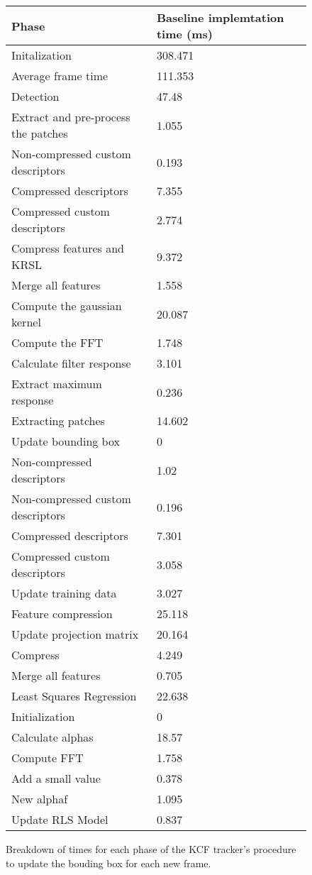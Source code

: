 \documentclass[11pt,english,letter]{article}
\begin{document}
\begin{figure}[htbp]
\begin{center}
    \begin{tabular}{ll}\hline
        \rowcolor{gray!30}Phase&Baseline implemtation time (ms)\\\hline
        \rowcolor{gray!20}Initalization&308.471\\
        \rowcolor{gray!20}Average frame time&111.353\\
        \rowcolor{gray!20}Detection&47.48\\
        Extract and pre-process the patches&1.055\\
        Non-compressed custom descriptors&0.193\\
        Compressed descriptors&7.355\\
        Compressed custom descriptors&2.774\\
        Compress features and KRSL&9.372\\
        Merge all features&1.558\\
        Compute the gaussian kernel&20.087\\
        Compute the FFT&1.748\\
        Calculate filter response&3.101\\
        Extract maximum response&0.236\\
        \rowcolor{gray!20}Extracting patches&14.602\\
        Update bounding box&0\\
        Non-compressed descriptors&1.02\\
        Non-compressed custom descriptors&0.196\\
        Compressed descriptors&7.301\\
        Compressed custom descriptors&3.058\\
        Update training data&3.027\\
        \rowcolor{gray!20}Feature compression&25.118\\
        Update projection matrix&20.164\\
        Compress&4.249\\
        Merge all features&0.705\\
        \rowcolor{gray!20}Least Squares Regression&22.638\\
        Initialization&0\\
        Calculate alphas&18.57\\
        Compute FFT&1.758\\
        Add a small value&0.378\\
        New alphaf&1.095\\
        Update RLS Model&0.837\\\hline
    \end{tabular}
\end{center}
\caption{Breakdown of times for each phase of the KCF tracker's procedure to update the bouding box for each new frame\label{tab}.}
\end{figure}
\end{document}
